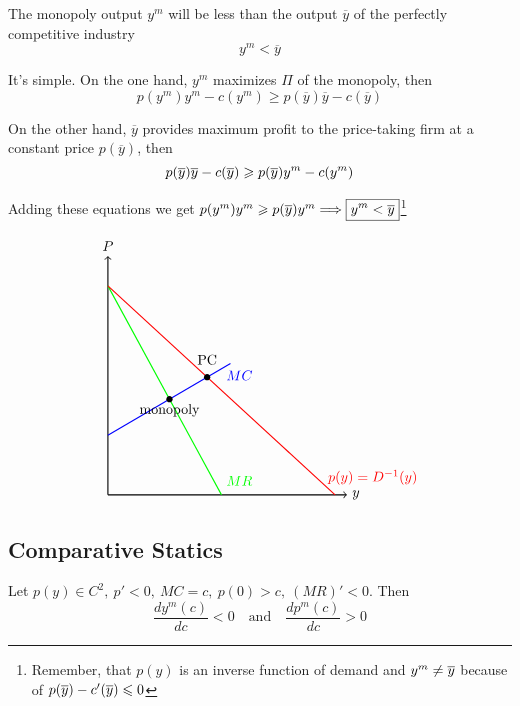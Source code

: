\documentclass[a4paper, 10pt]{article}
\begin{document}
\noindent
\begin{minipage}{0.5\textwidth}
\proposition The monopoly output $y^m$ will be less than the output $\overline{y}$ of the perfectly competitive industry
\begin{equation}\label{eq:1.8.1}
    y^m<\overline{y}
\end{equation}

\proof It's simple. On the one hand, $y^m$ maximizes $\Pi$ of the monopoly, then
$$p(y^m)y^m-c(y^m)\geqslant p(\overline{y})\overline{y}-c(\overline{y})$$

On the other hand, $\overline{y}$ provides maximum profit to the price-taking firm at a constant price $p(\overline{y})$, then
$$p(\overline{y})\overline{y}-c(\overline{y})\geqslant p(\overline{y})y^m-c(y^m)$$

Adding these equations we get $p(y^m)y^m\geqslant p(\ov{y})y^m\Longrightarrow\boxed{y^m<\ov{y}}$\footnote{Remember, that $p(y)$ is an inverse function of demand and $y^m\ne \ov{y}$ because of $p(\ov{y})-c'(\ov{y})\leqslant0$}
\end{minipage}
\begin{minipage}{0.5\textwidth}
$$
\begin{tikzpicture}[scale=1.5]

    \draw[thick,->] (0,0) -- (4,0) node[right] {$y$}; 
    \draw[thick,->] (0,0) -- (0,4) node[above] {$P$};

    \draw[thick, green] (0,3.5) -- (1.9,0); 
    \draw[thick, blue] (0,1) -- (2.05,2.2); 
    \draw[thick, red] (0,3.5) -- (3.8,0); %

    \fill[teal, black] (1.02988, 1.60286) circle (1.5pt);
    \fill[teal, black] (1.65957, 1.97145) circle (1.5pt);

    \node[anchor=north west, green] at (1.9,0.4) {$MR$};
    \node[anchor=north west, red] at (3.6,0.5) {$p(y)=D^{-1}(y)$};
    \node[blue] at (2.2,2) {$MC$};
    \node[anchor=south, black] at (1.65957, 2.1) {\text{PC}};
    \node[anchor=north, black] at (1.02988, 1.60286) {\text{monopoly}};
    
\end{tikzpicture}
$$
\end{minipage}
\subsection{Comparative Statics}
Let $p(y)\in C^2,\ p' <0,\ MC =c,\ p(0)>c,\ (MR)' <0$. Then
\begin{equation*}
    \frac{dy^m(c)}{dc}<0\quad \text{and}\quad\frac{dp^m(c)}{dc}>0
\end{equation*}
\end{document}
